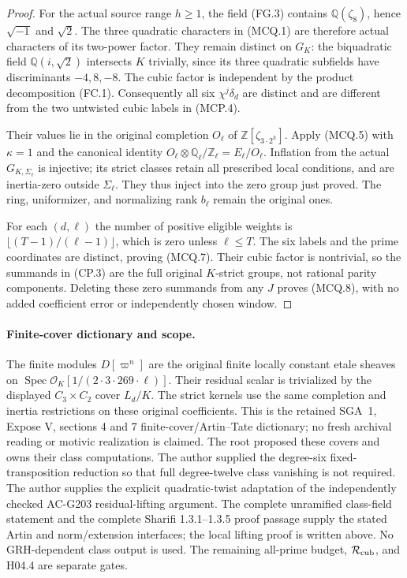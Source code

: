 \begin{proof}
For the actual source range $h\geq1$, the field (FG.3)
contains $\mathbb Q(\zeta_8)$, hence $\sqrt{-1}$ and
$\sqrt2$.  The three quadratic characters in (MCQ.1) are
therefore actual characters of its two-power factor.
They remain distinct on $G_K$: the biquadratic field
$\mathbb Q(i,\sqrt2)$ intersects $K$ trivially, since its
three quadratic subfields have discriminants $-4,8,-8$.
The cubic factor is independent by the product decomposition
(FC.1).  Consequently all six $\chi^j\delta_d$ are distinct
and are different from the two untwisted cubic labels in
(MCP.4).

Their values lie in the original completion $O_\ell$ of
$\mathbb Z[\zeta_{3\cdot2^h}]$.  Apply (MCQ.5) with
$\kappa=1$ and the canonical identity
$O_\ell\otimes\mathbb Q_\ell/\mathbb Z_\ell=E_\ell/O_\ell$.
Inflation from the actual $G_{K,\Sigma_\ell}$ is injective;
its strict classes retain all prescribed local conditions,
and are inertia-zero outside $\Sigma_\ell$.  They thus
inject into the zero group just proved.  The ring, uniformizer,
and normalizing rank $b_\ell$ remain the original ones.

For each $(d,\ell)$ the number of positive eligible weights
is $\lfloor(T-1)/(\ell-1)\rfloor$, which is zero unless
$\ell\leq T$.  The six labels and the prime coordinates are
distinct, proving (MCQ.7).  Their cubic factor is nontrivial,
so the summands in (CP.3) are the full original $K$-strict
groups, not rational parity components.  Deleting these
zero summands from any $J$ proves (MCQ.8), with no added
coefficient error or independently chosen window.
\end{proof}

\paragraph{Finite-cover dictionary and scope.}
The finite modules $D[\varpi^n]$ are the original finite
locally constant etale sheaves on
$\operatorname{Spec}\mathcal O_K[1/(2\cdot3\cdot269\cdot\ell)]$.
Their residual scalar is trivialized by the displayed
$C_3\times C_2$ cover $L_d/K$.  The strict kernels use the
same completion and inertia restrictions on these original
coefficients.  This is the retained SGA~1, Expose V,
sections 4 and 7 finite-cover/Artin--Tate dictionary; no
fresh archival reading or motivic realization is claimed.
The root proposed these covers and owns their class computations.
The author supplied the degree-six fixed-transposition reduction
so that full degree-twelve class vanishing is not required.
The author supplies the explicit quadratic-twist adaptation
of the independently checked AC-G203 residual-lifting argument.
The complete unramified class-field statement and the
complete Sharifi 1.3.1--1.3.5 proof passage supply the stated
Artin and norm/extension interfaces; the local lifting proof
is written above.  No GRH-dependent class output is used.
The remaining all-prime budget, $\mathcal R_{\rm cub}$,
and H04.4 are separate gates.

